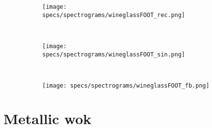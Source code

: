 \begin{figure}
    \begin{subfigure}[b]{0.25\textwidth}
        \texttt{[image: specs/spectrograms/wineglassFOOT\_rec.png]}
    \end{subfigure}%
    ~ %
    \begin{subfigure}[b]{0.25\textwidth}
        \texttt{[image: specs/spectrograms/wineglassFOOT\_sin.png]}
    \end{subfigure}%
    ~ %
    \begin{subfigure}[b]{0.25\textwidth}
        \texttt{[image: specs/spectrograms/wineglassFOOT\_fb.png]}
    \end{subfigure}%
\end{figure}

\section*{Metallic wok}

